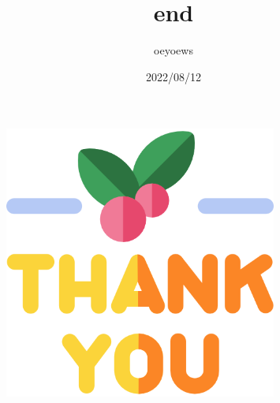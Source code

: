 \documentclass[UTF8]{article}
\title{end \emoji{rocket}}
\author{oeyoews}
\date{2022/08/12}
\begin{document}
\maketitle

\begin{figure}[htpb]
	\centering
	\includegraphics[width=0.8\textwidth]{img/end}
	\label{fig:img-end}
\end{figure}
\end{document}
